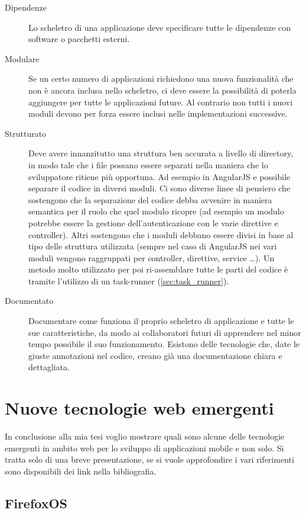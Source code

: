 \begin{description}
\item[Dipendenze] Lo scheletro di una applicazione deve specificare tutte le dipendenze con software o pacchetti esterni.

\item[Modulare] Se un certo numero di applicazioni richiedono una nuova funzionalità che non è ancora inclusa nello scheletro, ci deve essere la possibilità di poterla aggiungere per tutte le applicazioni future. Al contrario non tutti i nuovi moduli devono per forza essere inclusi nelle implementazioni successive.

\item[Strutturato] Deve avere innanzitutto una struttura ben accurata a livello di directory, in modo tale che i file possano essere separati nella maniera che lo sviluppatore ritiene più opportuna. Ad esempio in AngularJS e possibile separare il codice in diversi moduli. Ci sono diverse linee di pensiero che sostengono che la separazione del codice debba avvenire in maniera semantica per il ruolo che quel modulo ricopre (ad esempio un modulo potrebbe essere la gestione dell'autenticazione con le varie direttive e controller). Altri sostengono che i moduli debbano essere divisi in base al tipo delle struttura utilizzata (sempre nel caso di AngularJS nei vari moduli vengono raggruppati per controller, direttive, service \ldots).
Un metodo molto utilizzato per poi ri-assemblare tutte le parti del codice è tramite l'utilizzo di un task-runner (\ref{sec:task_runner}).

\item[Documentato] Documentare come funziona il proprio scheletro di applicazione e tutte le sue caratteristiche, da modo ai collaboratori futuri di apprendere nel minor tempo possibile il suo funzionamento. Esistono delle tecnologie che, date le giuste annotazioni nel codice, creano già una documentazione chiara e dettagliata.
\end{description} 

\section{Nuove tecnologie web emergenti}
In conclusione alla mia tesi voglio mostrare quali sono alcune delle tecnologie emergenti in ambito web per lo sviluppo di applicazioni mobile e non solo. Si tratta solo di una breve presentazione, se si vuole approfondire i vari riferimenti sono disponibili dei link nella bibliografia.
\subsection{FirefoxOS}

